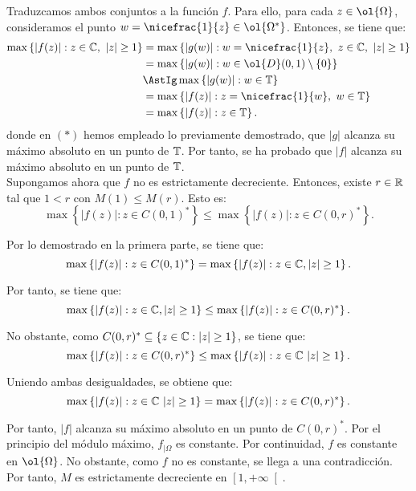 \begin{ejercicio}
    Traduzcamos ambos conjuntos a la función $f$. Para ello, para cada $z\in \ol{\Omega}$, consideramos el punto $w = \nicefrac{1}{z}\in \ol{\Omega^*}$. Entonces, se tiene que:
    \begin{align*}
        \max\left\{ |f(z)| : z\in \bb{C},\ |z|\geq 1 \right\} &= \max\left\{ |g(w)| : w=\nicefrac{1}{z},\ z\in \bb{C},\ |z|\geq 1 \right\} \\
        &= \max\left\{ |g(w)| : w\in \ol{D}(0,1)\setminus \{0\} \right\} \\
        &\AstIg \max\left\{ |g(w)| : w\in \bb{T} \right\}\\
        &= \max\left\{ |f(z)| : z=\nicefrac{1}{w},\ w\in \bb{T} \right\} \\
        &= \max\left\{ |f(z)| : z\in \bb{T} \right\}.
    \end{align*}
    donde en $(\ast)$ hemos empleado lo previamente demostrado, que $|g|$ alcanza su máximo absoluto en un punto de $\mathbb{T}$. Por tanto, se ha probado que $|f|$ alcanza su máximo absoluto en un punto de $\mathbb{T}$.\\

    Supongamos ahora que $f$ no es estrictamente decreciente. Entonces, existe $r\in \mathbb{R}$ tal que $1 < r$ con $M(1) \leq M(r)$. Esto es:
    \begin{equation*}
        \max\left\{ |f(z)| : z\in C(0,1)^* \right\} \leq \max\left\{ |f(z)| : z\in C(0,r)^* \right\}.
    \end{equation*}

    Por lo demostrado en la primera parte, se tiene que:
    \begin{equation*}
        \max\left\{ |f(z)| : z\in C(0,1)^* \right\} = \max\left\{ |f(z)| : z\in \mathbb{C}, |z|\geq 1 \right\}.
    \end{equation*}

    Por tanto, se tiene que:
    \begin{equation*}
        \max\left\{ |f(z)| : z\in \mathbb{C}, |z|\geq 1 \right\} \leq \max\left\{ |f(z)| : z\in C(0,r)^* \right\}.
    \end{equation*}
    
    No obstante, como $C(0,r)^* \subseteq \{z\in \mathbb{C} : |z|\geq 1\}$, se tiene que:
    \begin{equation*}
        \max\left\{ |f(z)| : z\in C(0,r)^* \right\} \leq \max\left\{ |f(z)| : z\in \mathbb{C}\ |z|\geq 1 \right\}.
    \end{equation*}

    Uniendo ambas desigualdades, se obtiene que:
    \begin{equation*}
        \max\left\{ |f(z)| : z\in \mathbb{C}\ |z|\geq 1 \right\} = \max\left\{ |f(z)| : z\in C(0,r)^* \right\}.
    \end{equation*}

    Por tanto, $|f|$ alcanza su máximo absoluto en un punto de $C(0,r)^*$. Por el principio del módulo máximo, $f_{\big|\Omega}$ es constante. Por continuidad, $f$ es constante en $\ol{\Omega}$. No obstante, como $f$ no es constante, se llega a una contradicción. Por tanto, $M$ es estrictamente decreciente en $\left[1,+\infty\right[$.
\end{ejercicio}

